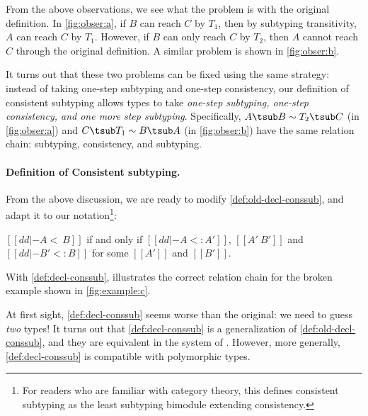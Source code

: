 From the above observations, we see what the problem is with the original
definition. In \cref{fig:obser:a}, if $B$ can reach $C$ by $T_1$, then by
subtyping transitivity, $A$ can reach $C$ by $T_1$. However, if $B$ can only reach $C$ by
$T_2$, then $A$ cannot reach $C$ through the original definition. A similar
problem is shown in \cref{fig:obser:b}.

It turns out that these two problems can be fixed using the same strategy:
instead of taking one-step subtyping and one-step consistency, our definition of
consistent subtyping allows types to take \emph{one-step subtyping, one-step
consistency, and one more step subtyping}. Specifically, $A \tsub B \sim T_2
\tsub C$ (in \cref{fig:obser:a})
and $C \tsub T_1 \sim B \tsub A$ (in \cref{fig:obser:b}) have the same relation chain: subtyping,
consistency, and subtyping.

\paragraph{Definition of Consistent subtyping.} From the above discussion, we are
ready to modify \cref{def:old-decl-conssub}, and adapt it to our
notation\footnote{For readers who are familiar with category theory,
  this defines consistent subtyping as the least subtyping bimodule
  extending consistency.}:
\begin{definition}
  \label{def:decl-conssub}
  $[[dd |- A <~ B]] $ if and only if  $ [[dd |- A <: A']]$, $[[  A' ~ B'  ]]$ and $[[ dd |- B' <: B ]]$ for some $[[A']]$ and $[[B']]$.
\end{definition}
\noindent With \cref{def:decl-conssub}, 
illustrates the correct relation chain for the broken example shown in
\cref{fig:example:c}.

At first sight, \cref{def:decl-conssub}
seems worse than the original: we need to guess \emph{two} types! It turns out
that \cref{def:decl-conssub} is a generalization of
\cref{def:old-decl-conssub}, and they are equivalent in the system of
\citet{siek2007gradual}. However, more generally, \cref{def:decl-conssub}
is compatible with polymorphic types.

